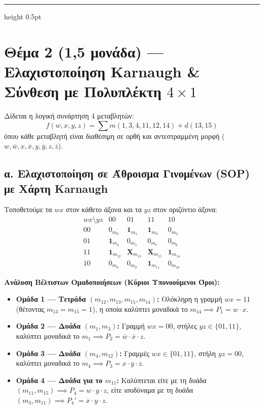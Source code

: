 \documentclass[11pt, a4paper]{article}
\begin{document}
\vspace{0.5em}
\hrule height 0.5pt
\vspace{0.8em}

\section*{Θέμα 2 (1,5 μονάδα) --- Ελαχιστοποίηση Karnaugh \& Σύνθεση με Πολυπλέκτη $4\times 1$}

Δίδεται η λογική συνάρτηση 4 μεταβλητών:
\[
f(w, x, y, z) = \sum m(1, 3, 4, 11, 12, 14) + d(13, 15)
\]
όπου κάθε μεταβλητή είναι διαθέσιμη σε ορθή και αντεστραμμένη μορφή ($w, \overline{w}, x, \overline{x}, y, \overline{y}, z, \overline{z}$).

\subsection*{α. Ελαχιστοποίηση σε Άθροισμα Γινομένων (SOP) με Χάρτη Karnaugh}

Τοποθετούμε τα $wx$ στον κάθετο άξονα και τα $yz$ στον οριζόντιο άξονα:
\[
\begin{array}{c|cccc}
wx \setminus yz & 00 & 01 & 11 & 10 \\
\hline
00 & 0_{m_0} & \mathbf{1}_{m_1} & \mathbf{1}_{m_3} & 0_{m_2} \\
01 & \mathbf{1}_{m_4} & 0_{m_5} & 0_{m_7} & 0_{m_6} \\
11 & \mathbf{1}_{m_{12}} & \mathbf{X}_{m_{13}} & \mathbf{X}_{m_{15}} & \mathbf{1}_{m_{14}} \\
10 & 0_{m_8} & 0_{m_9} & \mathbf{1}_{m_{11}} & 0_{m_{10}}
\end{array}
\]

\textbf{Ανάλυση Βέλτιστων Ομαδοποιήσεων (Κύριοι Υπονοούμενοι Όροι):}
\begin{itemize}[leftmargin=1.5em, noitemsep]
    \item \textbf{Ομάδα 1 --- Τετράδα $(m_{12}, m_{13}, m_{15}, m_{14})$:} Ολόκληρη η γραμμή $wx = 11$ (θέτοντας $m_{13}=m_{15}=1$), η οποία καλύπτει μοναδικά το $m_{14} \implies P_1 = w \cdot x$.
    \item \textbf{Ομάδα 2 --- Δυάδα $(m_1, m_3)$:} Γραμμή $wx = 00$, στήλες $yz \in \{01, 11\}$, καλύπτει μοναδικά το $m_1 \implies P_2 = \overline{w} \cdot \overline{x} \cdot z$.
    \item \textbf{Ομάδα 3 --- Δυάδα $(m_4, m_{12})$:} Γραμμές $wx \in \{01, 11\}$, στήλη $yz = 00$, καλύπτει μοναδικά το $m_4 \implies P_3 = x \cdot \overline{y} \cdot \overline{z}$.
    \item \textbf{Ομάδα 4 --- Δυάδα για το $m_{11}$:} Καλύπτεται είτε με τη δυάδα $(m_{11}, m_{15}) \implies P_4 = w \cdot y \cdot z$, είτε ισοδύναμα με τη δυάδα $(m_3, m_{11}) \implies P_4' = \overline{x} \cdot y \cdot z$.
\end{itemize}
\end{document}
